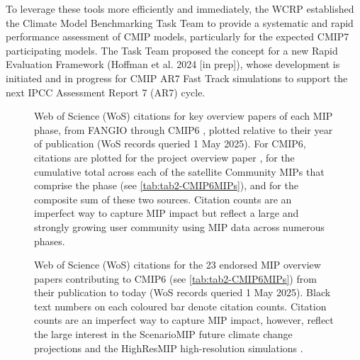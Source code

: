 \documentclass[manuscript]{copernicus}
\begin{document}
{To leverage these tools more efficiently and immediately, the WCRP established the Climate Model Benchmarking Task Team to provide a systematic and rapid performance assessment of CMIP models, particularly for the expected CMIP7 participating models. The Task Team proposed the concept for a new Rapid Evaluation Framework (Hoffman et al. 2024 [in prep]), whose development is initiated and in progress for CMIP AR7 Fast Track simulations to support the next IPCC Assessment Report 7 (AR7) cycle.
}


\begin{figure}
    \centering
    
    \caption{Web of Science (WoS) citations for key overview papers of each MIP phase, from FANGIO \citep{cess_intercomparison_1990} through CMIP6 \citep{eyring_overview_2016}, plotted relative to their year of publication (WoS records queried 1 May 2025). For CMIP6, citations are plotted for the project overview paper \citep{eyring_overview_2016}, for the cumulative total across each of the satellite Community MIPs that comprise the phase (see \autoref{tab:tab2-CMIP6MIPs}), and for the composite sum of these two sources. Citation counts are an imperfect way to capture MIP impact but reflect a large and strongly growing user community using MIP data across numerous phases.}
    \label{fig:fig3-MIPPhaseCitations}
\end{figure}


\begin{figure}
    \centering
    
    \caption{Web of Science (WoS) citations for the 23 endorsed MIP overview papers contributing to CMIP6 (see \autoref{tab:tab2-CMIP6MIPs}) from their publication to today (WoS records queried 1 May 2025). Black text numbers on each coloured bar denote citation counts. Citation counts are an imperfect way to capture MIP impact, however, reflect the large interest in the ScenarioMIP future climate change projections \citep{oneill_scenario_2016} and the HighResMIP high-resolution simulations \citep{haarsma_high_2016}.}
    \label{fig:fig4-MIPCitations}
\end{figure}
\end{document}
